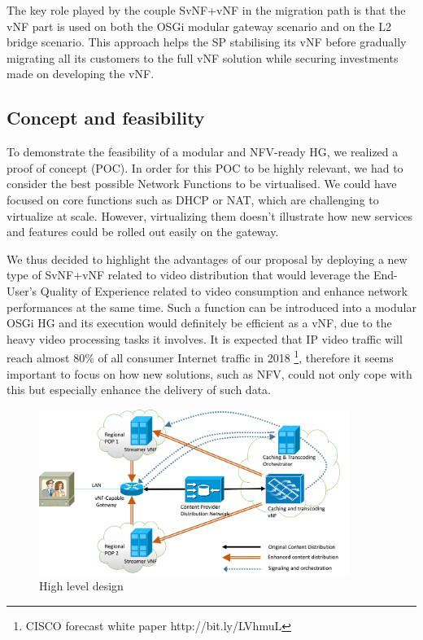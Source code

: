 The key role played by the couple SvNF+vNF in the migration path is that the vNF part is used on both the OSGi modular gateway scenario and on the L2 bridge scenario.
This approach helps the SP stabilising its vNF before gradually migrating all its customers to the full vNF solution while securing investments made on developing the vNF.
 
\subsection{Concept and feasibility}
To demonstrate the feasibility of a modular and NFV-ready HG, we realized a proof of concept (POC).
In order for this POC to be highly relevant, we had to consider the best possible Network Functions to be virtualised.
We could have focused on core functions such as DHCP or NAT, which are challenging to virtualize at scale. However, virtualizing them doesn't illustrate how new services and features could be rolled out easily on the gateway.

We thus decided to highlight the advantages of our proposal by deploying a new type of SvNF+vNF related to video distribution that would leverage the End-User's Quality of Experience related to video consumption and enhance network performances at the same time.
Such a function can be introduced into a modular OSGi HG and its execution would definitely be efficient as a vNF, due to the heavy video processing tasks it involves.
It is expected that IP video traffic will reach almost 80\% of all consumer Internet traffic in 2018 \footnote{CISCO forecast white paper http://bit.ly/LVhmuL }, therefore it seems important to focus on how new solutions, such as NFV, could not only cope with this but especially enhance the delivery of such data.

\begin{figure}
	
	\center

	\includegraphics[width=0.90\textwidth,natwidth=8132,natheight=4335]{fig/highleveldesign.png}
	\caption{ High level design
    \label{fig:hld}
    }

\end{figure}

